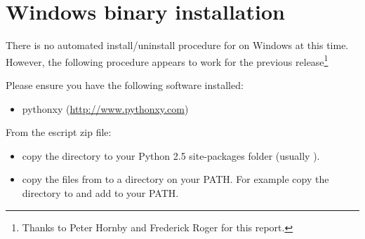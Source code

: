 
%
%
%

\section{Windows binary installation}
\label{sec:binwin}

There is no automated install/uninstall procedure for \esfinley on Windows at this time.
However, the following procedure appears to work for the previous release\footnote{Thanks to Peter Hornby and Frederick Roger for this report.}

Please ensure you have the following software installed: 
\begin{itemize}
 \item pythonxy (\url{http://www.pythonxy.com})
\end{itemize}

From the escript zip file:
\begin{itemize}
\item 
 copy the  directory to your Python 2.5 site-packages folder (usually ).
\item 
 copy the  files from  to a directory on your PATH. For example copy the directory to  and add   to your PATH.
\end{itemize}

